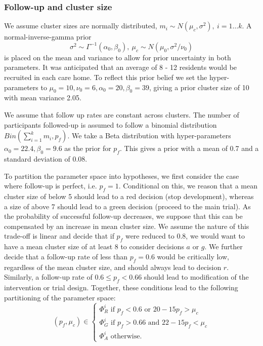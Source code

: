 \documentclass[AMA,STIX1COL]{WileyNJD-v2}
\begin{document}
\subsubsection{Follow-up and cluster size}

We assume cluster sizes are normally distributed, $m_{i} \sim N(\mu_{c}, \sigma^{2}),~ i = 1 \ldots k$. A normal-inverse-gamma prior 
\begin{equation}
\sigma^{2} \sim \Gamma^{-1} (\alpha_{0}, \beta_{0}), ~ \mu_{c} \sim N(\mu_{0}, \sigma^{2}/\nu_{0})
\end{equation}
is placed on the mean and variance to allow for prior uncertainty in both parameters. It was anticipated that an average of 8 - 12 residents would be recruited in each care home. To reflect this prior belief we set the hyper-parameters to $\mu_{0} = 10, \nu_{0} = 6, \alpha_{0} = 20, \beta_{0} = 39$, giving a prior cluster size of 10 with mean variance 2.05.

We assume that follow up rates are constant across clusters. The number of participants followed-up is assumed to follow a binomial distribution $Bin(\sum_{i=1}^{k} m_{i}, p_{f})$. We take a Beta distribution with hyper-parameters $\alpha_{0} = 22.4, \beta_{0} = 9.6$ as the prior for $p_{f}$. This gives a prior with a mean of 0.7 and a standard deviation of 0.08.

To partition the parameter space into hypotheses, we first consider the case where follow-up is perfect, i.e. $p_{f} = 1$. Conditional on this, we reason that a mean cluster size of below 5 should lead to a red decision (stop development), whereas a size of above 7 should lead to a green decision (proceed to the main trial). As the probability of successful follow-up decreases, we suppose that this can be compensated by an increase in mean cluster size. We assume the nature of this trade-off is linear and decide that if $p_{f}$ were reduced to 0.8, we would want to have a mean cluster size of at least 8 to consider decisions $a$ or $g$.  We further decide that a follow-up rate of less than $p_{f} = 0.6$ would be critically low, regardless of the mean cluster size, and should always lead to decision $r$. Similarly, a follow-up rate of $0.6 \leq p_{f} < 0.66$ should lead to modification of the intervention or trial design. Together, these conditions lead to the following partitioning of the parameter space:
\begin{equation}
  (p_{f}, \mu_{c}) \in \begin{cases}
               \Phi^i_R \text{ if } p_{f} < 0.6 \text{ or } 20-15p_{f} > \mu_{c} \\
               \Phi^i_G \text{ if } p_{f} > 0.66 \text{ and } 22-15p_{f} < \mu_{c} \\
               \Phi^i_A \text{ otherwise.}
            \end{cases}
\end{equation}
\end{document}
